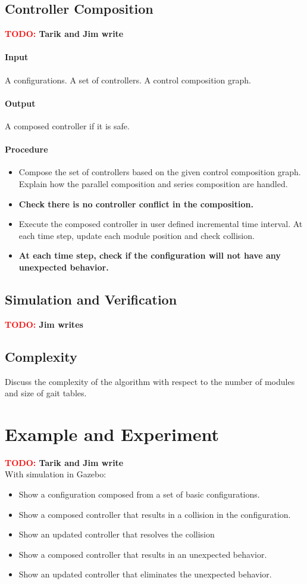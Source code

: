 \documentclass[conference]{IEEEtran}
\theoremstyle{definition}
\newcommand{\TODO}[1]{ {\bf \textcolor{red}{TODO:} #1 }}
\begin{document}
\subsection{Controller Composition}
\TODO{Tarik and Jim write}
\paragraph{Input}
A configurations. A set of controllers. A control composition graph.
\paragraph{Output}
A composed controller if it is safe.
\paragraph{Procedure}
\begin{itemize}
\item Compose the set of controllers based on the given control composition graph. Explain how the parallel composition and series composition are handled.
\item\textbf{Check there is no controller conflict in the composition.}
\item Execute the composed controller in user defined incremental time interval. At each time step, update each module position and check collision.
\item \textbf{At each time step, check if the configuration will not have any unexpected behavior.}
\end{itemize}

\subsection{Simulation and Verification}
\TODO{Jim writes}

\subsection{Complexity}
Discuss the complexity of the algorithm with respect to the number of modules and size of gait tables.

\section{Example and Experiment}
\label{sec:example}
\TODO{Tarik and Jim write}\\
With simulation in Gazebo:
\begin{itemize}
\item Show a configuration composed from a set of basic configurations.
\item Show a composed controller that results in a collision in the configuration.
\item Show an updated controller that resolves the collision
\item Show a composed controller that results in an unexpected behavior.
\item Show an updated controller that eliminates the unexpected behavior.
\end{itemize}
\end{document}
